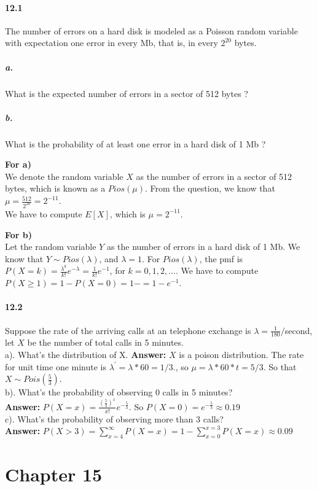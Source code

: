 \documentclass[11pt]{article} %
\begin{document}
\paragraph*{12.1} The number of errors on a hard disk is modeled as a Poisson random variable with expectation one error in every Mb, that is, in every $2^{20}$ bytes.
\subparagraph*{a.} What is the expected number of errors in a sector of 512 bytes ?
\subparagraph*{b.} What is the probability of at least one error in a hard disk of 1 Mb ?

{\bf For a)} \\
We denote the random variable $X$ as the number of errors in a sector of 512 bytes, which is known as a $Pios(\mu)$. From the question, we know that $\mu = \frac{512}{2^{20}} = 2^{-11}$.\\
We have to compute $E[X]$, which is $\mu = 2^{-11}$. 

{\bf For b)}\\
Let the random variable $Y$ as the number of errors in a hard disk of 1 Mb. We know that $Y \sim Pios(\lambda)$, and $\lambda = 1$. For $Pios(\lambda)$, the pmf is $P(X=k)=\frac{\lambda^k}{k!}e^{-\lambda} = \frac{1}{k!}e^{-1}$, for $k=0, 1, 2, \ldots$.
We  have to compute $P(X\geq 1) = 1 - P(X=0)  = 1 -  = 1 - e^{-1}$.

\paragraph*{12.2}
Suppose the rate of the arriving calls at an telephone exchange is $\lambda = \frac{1}{180}/$second, let $X$ be the number of total calls in 5 minutes.\\
a). What's the distribution of X.
\textbf{Answer:} $X$ is a poison distribution. The rate for unit time one minute is $\lambda^\prime = \lambda*60 = 1/3.$, so $\mu = \lambda *60 *t = 5/3$. So that $X\sim Pois(\frac{5}{3})$.\\

b). What's the probability of observing 0 calls in 5 minutes?\\
\textbf{Answer:} $P(X=x) = \frac{(\frac{5}{3})^x}{x!}e^{-\frac{5}{3}}$. So $P(X=0) = e^{-\frac{5}{3}} \approx 0.19$\\

c). What's the probability of observing more than 3 calls?\\
\textbf{Answer:} $P(X>3) = \sum^{\infty}_{x=4}P(X=x) = 1-\sum^{x=3}_{x=0}P(X=x) \approx 0.09$ 

\section{Chapter 15}
\end{document}
